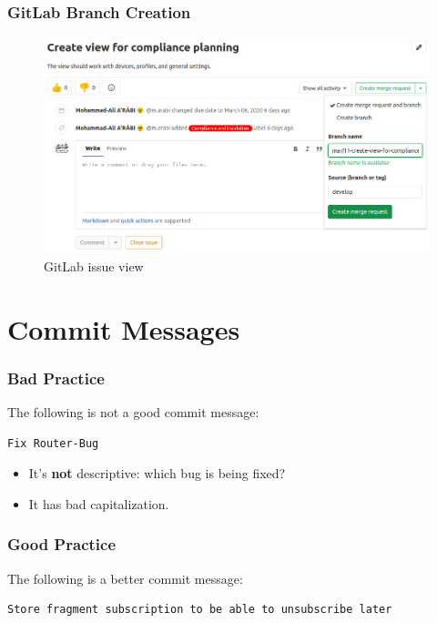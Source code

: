 \documentclass[10pt, compress]{beamer}
\begin{document}
\begin{frame}[fragile]
  \frametitle{GitLab Branch Creation}
  
  \begin{figure}
      \centering
      \includegraphics[scale=0.3]{images/gitlab-branch-3.png}
      \caption{GitLab issue view}
      \label{fig:gitlab3}
  \end{figure}

\end{frame}

\section{Commit Messages}

\begin{frame}[fragile]
  \frametitle{Bad Practice}
  
  The following is not a good commit message:
  \begin{verbatim}
Fix Router-Bug
  \end{verbatim}
  
  \begin{itemize}
      \item It's \textbf{not} descriptive: which bug is being fixed?
      \item It has bad capitalization.
  \end{itemize}

\end{frame}

\begin{frame}[fragile]
  \frametitle{Good Practice}
  
  The following is a better commit message:
  \begin{verbatim}
Store fragment subscription to be able to unsubscribe later
  \end{verbatim}

\end{frame}
\end{document}
